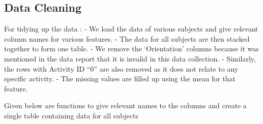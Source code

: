 \documentclass[11pt]{article}
\begin{document}
    \hypertarget{data-cleaning}{%
\subsection{\texorpdfstring{Data
Cleaning}{Data Cleaning }}\label{data-cleaning}}

For tidying up the data : - We load the data of various subjects and
give relevant column names for various features. - The data for all
subjects are then stacked together to form one table. - We remove the
`Orientation' columns because it was mentioned in the data report that
it is invalid in this data collection. - Similarly, the rows with
Activity ID ``0'' are also removed as it does not relate to any specific
activity. - The missing values are filled up using the mean for that
feature.

    Given below are functions to give relevant names to the columns and
create a single table containing data for all subjects
\end{document}
